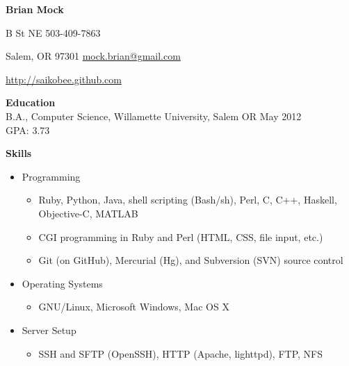 \documentclass[10pt]{article}
\begin{document}
\noindent
\begin{center}
\textbf{\Large Brian Mock}
\end{center}

 B St NE
\hfill
503-409-7863

\noindent
Salem, OR 97301
\hfill
\url{mock.brian@gmail.com}

\noindent
\hfill
\url{http://saikobee.github.com}

\bigskip
\smallskip

\medskip
\noindent \textbf{Education} \hrulefill \\
\hangindent=24pt
B.A., Computer Science, Willamette University, Salem OR
May 2012 \\
GPA: 3.73

\noindent \textbf{Skills} \hrulefill
\begin{itemize}
\item Programming
    \begin{itemize}
    \item Ruby, Python, Java, shell scripting (Bash/sh), Perl, C, C++,
    Haskell, Objective-C, MATLAB
    \item CGI programming in Ruby and Perl (HTML, CSS, file input, etc.)
    \item Git (on GitHub), Mercurial (Hg), and Subversion (SVN) source control
    \end{itemize}
\item Operating Systems
    \begin{itemize}
    \item GNU/Linux, Microsoft Windows, Mac OS X
    \end{itemize}
\item Server Setup
    \begin{itemize}
    \item SSH and SFTP (OpenSSH), HTTP (Apache, lighttpd), FTP, NFS
    \end{itemize}
\end{itemize}
\end{document}
